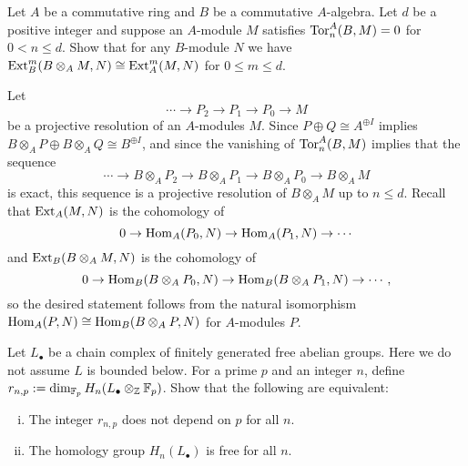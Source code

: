 \documentclass{../../../small}
\begin{document}
\begin{prb}
Let $A$ be a commutative ring and $B$ be a commutative $A$-algebra.
Let $d$ be a positive integer and suppose an $A$-module $M$ satisfies $\operatorname{Tor}^A_n(B,M)=0$ for $0<n\le d$.
Show that for any $B$-module $N$ we have $\operatorname{Ext}_B^m(B\otimes_ AM,N)\cong\operatorname{Ext}_A^m(M,N)$ for $0\le m\le d$.
\end{prb}
\begin{sol}
Let
\[\cdots\to P_2\to P_1\to P_0\to M\]
be a projective resolution of an $A$-modules $M$.
Since $P\oplus Q\cong A^{\oplus I}$ implies $B\otimes_AP\oplus B\otimes_AQ\cong B^{\oplus I}$, and since the vanishing of $\operatorname{Tor}_n^A(B,M)$ implies that the sequence
\[\cdots\to B\otimes_AP_2\to B\otimes_AP_1\to B\otimes_AP_0\to B\otimes_AM\]
is exact, this sequence is a projective resolution of $B\otimes_AM$ up to $n\le d$.
Recall that $\operatorname{Ext}_A(M,N)$ is the cohomology of
\[0\to\operatorname{Hom}_A(P_0,N)\to\operatorname{Hom}_A(P_1,N)\to\cdots\]
and $\operatorname{Ext}_B(B\otimes_AM,N)$ is the cohomology of
\[0\to\operatorname{Hom}_B(B\otimes_AP_0,N)\to\operatorname{Hom}_B(B\otimes_AP_1,N)\to\cdots,\]
so the desired statement follows from the natural isomorphism $\operatorname{Hom}_A(P,N)\cong\operatorname{Hom}_B(B\otimes_AP,N)$ for $A$-modules $P$.
\end{sol}

\begin{prb}
Let $L_\bullet$ be a chain complex of finitely generated free abelian groups.
Here we do not assume $L$ is bounded below.
For a prime $p$ and an integer $n$, define $r_{n,p}:=\dim_{\mathbb{F}_p}H_n(L_\bullet\otimes_{\mathbb{Z}}\mathbb{F}_p)$.
Show that the following are equivalent:
\begin{enumerate}[(i)]
\item The integer $r_{n,p}$ does not depend on $p$ for all $n$.
\item The homology group $H_n(L_\bullet)$ is free for all $n$.
\end{enumerate}
\end{prb}
\begin{sol}
\end{sol}
\end{document}
